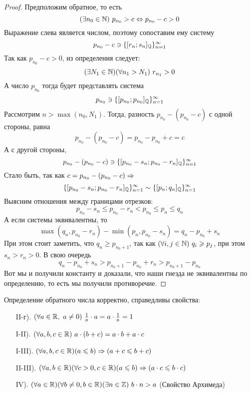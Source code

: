 \begin{proof}
    Предположим обратное, то есть
    \[
        (\exists n_0 \in \mathbb{N})\ p_{n_0} > c
        \Leftrightarrow p_{n_0} - c > 0
    \]
    Выражение слева является числом, поэтому сопоставим ему систему
    \[
        p_{n_0} - c \ni \{[r_n; s_n]_{\mathbb{Q}}\}_{n = 1}^\infty
    \]
    Так как $p_{n_0} - c > 0$, из определения следует:
    \[
        (\exists N_1 \in \mathbb{N})(\forall n_1 > N_1)\ r_{n_1} > 0
    \]
    А число $p_{n_0}$ тогда будет представлять система
    \[
        p_{n_0} \ni \{[p_{n_0}; p_{n_0}]_{\mathbb{Q}}\}_{n = 1}^\infty
    \]
    Рассмотрим $n > \max(n_0, N_1)$. Тогда, разность
    $p_{n_0} - (p_{n_0} - c)$ с одной стороны, равна
    \[
        p_{n_0} - (p_{n_0} - c) = p_{n_0} - p_{n_0} + c = c
    \]
    А с другой стороны,
    \[
        p_{n_0} - (p_{n_0} - c) \ni \{[p_{n_0} - s_n; p_{n_0} - r_n]_{\mathbb{Q}}\}_{n = 1}^\infty
    \]
    Стало быть, так как $c = p_{n_0} - (p_{n_0} - c) \Rightarrow$
    \[
        \{[p_{n_0} - s_n; p_{n_0} - r_n]_{\mathbb{Q}}\}_{n = 1}^\infty
        \sim \{[p_n; q_n]_{\mathbb{Q}}\}_{n = 1}^\infty
    \]
    Выясним отношения между границами отрезков:
    \[
        p_{n_0} - s_n \le p_{n_0} - r_n < p_{n_0} \le p_n \le q_n
    \]
    А если системы эквивалентны, то
    \[
        \max(q_n, p_{n_0} - r_n) - \min(p_n, p_{n_0} - s_n) =
        q_n - p_{n_0} + s_n
    \]
    При этом стоит заметить, что $q_n \ge p_{n_0 + 1}$,
    так как $(\forall i, j \in \mathbb{N})\ q_i \geqslant p_j$, при этом
    $s_n > r_n > 0$. В свою очередь
    \[
        q_n - p_{n_0} + s_n > p_{n_0 + 1} - p_{n_0} + r_n > p_{n_0 + 1} - p_{n_0}    
    \]
    Вот мы и получили константу и доказали, что наши гнезда не
    эквивалентны по определению, то есть мы получили противоречие.

\end{proof}

\begin{theorem}
    Определение обратного числа корректно, справедливы
    свойства:

    \begin{enumerate}
        \item[II-г).] $(\forall a \in \R,\ a\neq 0)\ 
            \frac{1}{a} \cdot a = a \cdot \frac{1}{a} = 1$
        \item[I-II).] $(\forall a, b, c \in \mathbb{R})\ a \cdot
            (b + c) = a \cdot b + a \cdot c$
        \item[I-III).] $(\forall a, b, c \in \mathbb{R})(a \leqslant b)
            \Rightarrow (a + c \leqslant b + c)$
        \item[II-III).] $(\forall a, b \in \mathbb{R})
            (\forall c > 0, c\in \mathbb{R})(a \leqslant b)
            \Rightarrow (a \cdot c \leqslant b \cdot c)$
        \item[IV).] $(\forall a \in \mathbb{R})(\forall b \neq 0,
        b \in \mathbb{R})(\exists n \in \mathbb{Z}) \ b \cdot n > a$ (Свойство Архимеда)

    \end{enumerate}
\end{theorem}

